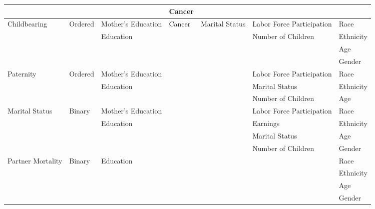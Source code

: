 \begin{table}
\begin{scriptsize}
\begin{tabular}{lllllll}
     & & & Cancer & & & \\
\midrule		
Childbearing & Ordered & Mother's Education  & Cancer & Marital Status & Labor Force Participation & Race \\
&  & Education  & & & Number of Children & Ethnicity \\
&  & & & &  & Age \\
& & & & & & Gender \\
\midrule		
Paternity & Ordered & Mother's Education & & & Labor Force Participation & Race \\
&  & Education & & & Marital Status  & Ethnicity \\
&  & & & & Number of Children  & Age \\
\midrule
Marital Status & Binary & Mother's Education & & & Labor Force Participation & Race \\
& & Education & & & Earnings & Ethnicity \\
& & & & & Marital Status & Age \\
& & & & & Number of Children & Gender \\
\midrule		
Partner Mortality & Binary & Education & & & & Race \\
& & & & &  & Ethnicity \\
& & & & & & Age \\
& & & & & & Gender \\
\bottomrule
\end{tabular}
\end{scriptsize}
\end{table}

